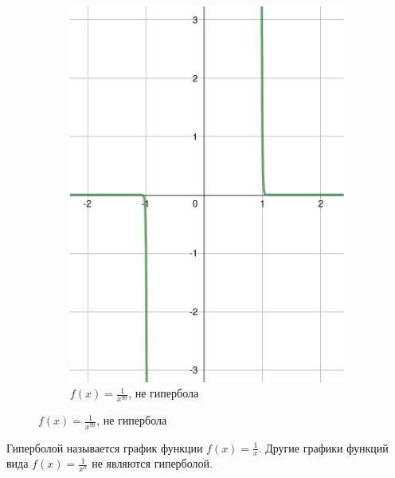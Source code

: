 \begin{figure}[h]
\begin{subfigure}{0.35\textwidth}
        \includegraphics[width=\textwidth]{tex/chapter_1/assets/y=1_div_by_x^99.pdf}
        \caption*{$f(x) = \frac{1}{x^{99}}$, не гипербола}
    \end{subfigure}
\end{figure}

\begin{remark}
    Гиперболой называется график функции $f(x) = \frac{1}{x}$. Другие графики функций вида $f(x) = \frac{1}{x^n}$ не являются гиперболой.
\end{remark}